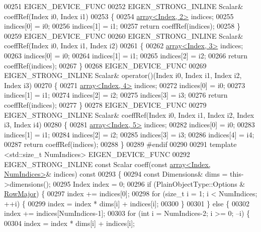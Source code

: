 \begin{DoxyCode}
00251     EIGEN\_DEVICE\_FUNC
00252     EIGEN\_STRONG\_INLINE Scalar& coeffRef(Index i0, Index i1)
00253     \{
00254       \hyperlink{class_eigen_1_1array}{array<Index, 2>} indices;
00255       indices[0] = i0;
00256       indices[1] = i1;
00257       \textcolor{keywordflow}{return} coeffRef(indices);
00258     \}
00259     EIGEN\_DEVICE\_FUNC
00260     EIGEN\_STRONG\_INLINE Scalar& coeffRef(Index i0, Index i1, Index i2)
00261     \{
00262       \hyperlink{class_eigen_1_1array}{array<Index, 3>} indices;
00263       indices[0] = i0;
00264       indices[1] = i1;
00265       indices[2] = i2;
00266       \textcolor{keywordflow}{return} coeffRef(indices);
00267     \}
00268     EIGEN\_DEVICE\_FUNC
00269     EIGEN\_STRONG\_INLINE Scalar& operator()(Index i0, Index i1, Index i2, Index i3)
00270     \{
00271       \hyperlink{class_eigen_1_1array}{array<Index, 4>} indices;
00272       indices[0] = i0;
00273       indices[1] = i1;
00274       indices[2] = i2;
00275       indices[3] = i3;
00276       \textcolor{keywordflow}{return} coeffRef(indices);
00277     \}
00278     EIGEN\_DEVICE\_FUNC
00279     EIGEN\_STRONG\_INLINE Scalar& coeffRef(Index i0, Index i1, Index i2, Index i3, Index i4)
00280     \{
00281       \hyperlink{class_eigen_1_1array}{array<Index, 5>} indices;
00282       indices[0] = i0;
00283       indices[1] = i1;
00284       indices[2] = i2;
00285       indices[3] = i3;
00286       indices[4] = i4;
00287       \textcolor{keywordflow}{return} coeffRef(indices);
00288     \}
00289 \textcolor{preprocessor}{#endif}
00290 
00291     \textcolor{keyword}{template} <std::\textcolor{keywordtype}{size\_t} NumIndices> EIGEN\_DEVICE\_FUNC
00292     EIGEN\_STRONG\_INLINE \textcolor{keyword}{const} Scalar coeff(\textcolor{keyword}{const} \hyperlink{class_eigen_1_1array}{array<Index, NumIndices>}& indices)\textcolor{keyword}{
       const}
00293 \textcolor{keyword}{    }\{
00294       \textcolor{keyword}{const} Dimensions& dims = this->dimensions();
00295       Index index = 0;
00296       \textcolor{keywordflow}{if} (PlainObjectType::Options & \hyperlink{group__enums_ggaacded1a18ae58b0f554751f6cdf9eb13acfcde9cd8677c5f7caf6bd603666aae3}{RowMajor}) \{
00297         index += indices[0];
00298         \textcolor{keywordflow}{for} (\textcolor{keywordtype}{size\_t} i = 1; i < NumIndices; ++i) \{
00299           index = index * dims[i] + indices[i];
00300         \}
00301       \} \textcolor{keywordflow}{else} \{
00302         index += indices[NumIndices-1];
00303         \textcolor{keywordflow}{for} (\textcolor{keywordtype}{int} i = NumIndices-2; i >= 0; --i) \{
00304           index = index * dims[i] + indices[i];

\end{DoxyCode}
